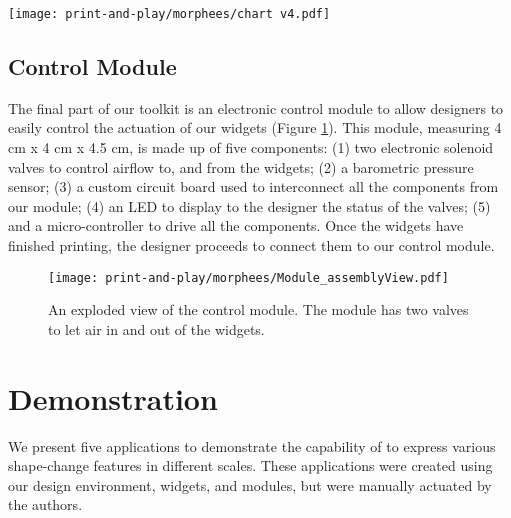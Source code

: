       \begin{figure*}[htb]
        \centering
        \texttt{[image: print-and-play/morphees/chart v4.pdf]}         
        \caption{Results of the characterization. These plots show magnitude of
          the modified features versus the change of shape the widgets expressed.
          The numbers on the widgets show the baseline size of the features. For
          example, Fold widget had a baseline parameters of gap 10 mm, length 20
          mm, height 20 mm, and width 10 mm. We then changed each parameter one by
          one, e.g., changed length from 10 mm to 80 mm (red line in the plot).}
        \label{fig:char-plot}
      \end{figure*}

    \subsection{Control Module}
      The final part of our toolkit is an electronic control module to allow
      designers to easily control the actuation of our widgets
      (Figure \ref{fig:module}). This module, measuring 4 cm x 4 cm x 4.5 cm,
      is made up of five components: (1) two electronic solenoid valves to
      control airflow to, and from the widgets; (2) a barometric pressure
      sensor; (3) a custom circuit board used to interconnect all the
      components from our module; (4) an LED to display to the designer the
      status of the valves; (5) and a micro-controller to drive all the
      components.  Once the widgets have finished printing, the designer
      proceeds to connect them to our control module.

      \begin{figure}
        \centering
        \texttt{[image: print-and-play/morphees/Module\_assemblyView.pdf]}
        \caption{An exploded view of the control module. The module has two
          valves to let air in and out of the widgets.}
        \label{fig:module}
      \end{figure}

  \section{Demonstration}
    We present five applications to demonstrate the capability of \mp to express
    various shape-change features in different scales. These applications were
    created using our design environment, widgets, and modules, but were
    manually actuated by the authors.
     

